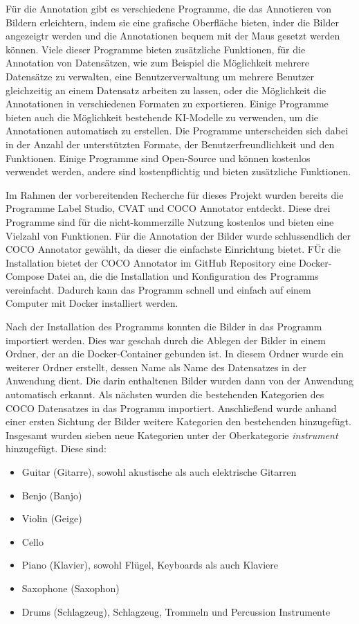 Für die Annotation gibt es verschiedene Programme, die das Annotieren von Bildern erleichtern, indem sie eine grafische Oberfläche bieten, inder die Bilder angezeigtr werden und die Annotationen bequem mit der Maus gesetzt werden können.
Viele dieser Programme bieten zusätzliche Funktionen, für die Annotation von Datensätzen, wie zum Beispiel die Möglichkeit mehrere Datensätze zu verwalten, eine Benutzerverwaltung um mehrere Benutzer gleichzeitig an einem Datensatz arbeiten zu lassen, oder die Möglichkeit die Annotationen in verschiedenen Formaten zu exportieren. Einige Programme bieten auch die Möglichkeit bestehende KI-Modelle zu verwenden, um die Annotationen automatisch zu erstellen.
Die Programme unterscheiden sich dabei in der Anzahl der unterstützten Formate, der Benutzerfreundlichkeit und den Funktionen. Einige Programme sind Open-Source und können kostenlos verwendet werden, andere sind kostenpflichtig und bieten zusätzliche Funktionen.

Im Rahmen der vorbereitenden Recherche für dieses Projekt wurden bereits die Programme Label Studio, CVAT und COCO Annotator entdeckt. Diese drei Programme sind für die nicht-kommerzille Nutzung kostenlos und bieten eine Vielzahl von Funktionen.
Für die Annotation der Bilder wurde schlussendlich der COCO Annotator gewählt, da dieser die einfachste Einrichtung bietet. FÜr die Installation bietet der COCO Annotator im GitHub Repository eine Docker-Compose Datei an, die die Installation und Konfiguration des Programms vereinfacht. Dadurch kann das Programm schnell und einfach auf einem Computer mit Docker installiert werden.

Nach der Installation des Programms konnten die Bilder in das Programm importiert werden. Dies war geschah durch die Ablegen der Bilder in einem Ordner, der an die Docker-Container gebunden ist. In diesem Ordner wurde ein weiterer Ordner erstellt, dessen Name als Name des Datensatzes in der Anwendung dient. Die darin enthaltenen Bilder wurden dann von der Anwendung automatisch erkannt.
Als nächsten wurden die bestehenden Kategorien des COCO Datensatzes in das Programm importiert. Anschließend wurde anhand einer ersten Sichtung der Bilder weitere Kategorien den bestehenden hinzugefügt.
Insgesamt wurden sieben neue Kategorien unter der Oberkategorie \emph{instrument} hinzugefügt. Diese sind:
\begin{itemize}
    \item Guitar (Gitarre), sowohl akustische als auch elektrische Gitarren
    \item Benjo (Banjo)
    \item Violin (Geige)
    \item Cello
    \item Piano (Klavier), sowohl Flügel, Keyboards als auch Klaviere
    \item Saxophone (Saxophon)
    \item Drums (Schlagzeug), Schlagzeug, Trommeln und Percussion Instrumente
\end{itemize}

